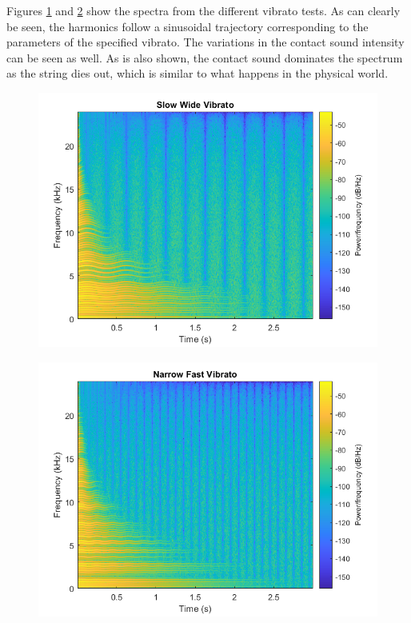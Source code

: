\documentclass[../main.tex]{subfiles}
\begin{document}
Figures \ref{fig:VibratoWideSpec} and \ref{fig:VibratoNarrowSpec} show the spectra from the different vibrato tests. As can clearly be seen, the harmonics follow a sinusoidal trajectory corresponding to the parameters of the specified vibrato. The variations in the contact sound intensity can be seen as well. As is also shown, the contact sound dominates the spectrum as the string dies out, which is similar to what happens in the physical world.

\begin{figure}[h]
    \centering
    \includegraphics[scale=.65]{./images/plots/VibratoWideSpec.png}
    \caption{}
    \label{fig:VibratoWideSpec}
\end{figure}

\begin{figure}[h]
    \centering
    \includegraphics[scale=.65]{./images/plots/VibratoNarrowSpec.png}
    \caption{}
    \label{fig:VibratoNarrowSpec}
\end{figure}
\end{document}
